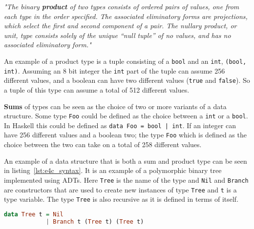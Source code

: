 \documentclass[10pt]{report}
\def\code#1{\texttt{#1}} %
\begin{document}
\par{\textit{"The binary \textbf{product} of two types consists of ordered pairs of values, one from each type in the order specified. The associated eliminatory forms are projections, which select the first and second component of a pair. The nullary product, or unit, type consists solely of the unique “null tuple” of no values, and has no associated eliminatory form."}}
\par{An example of a product type is a tuple consisting of a \code{bool} and an \code{int}, \code{(bool, int)}. Assuming an 8 bit integer the \code{int} part of the tuple can assume 256 different values, and a boolean can have two different values (\code{true} and \code{false}). So a tuple of this type can assume a total of 512 different values.}
\par{\textbf{Sums} of types can be seen as the choice of two or more variants of a data structure. Some type \code{Foo} could be defined as the choice between a \code{int} or a \code{bool}. In Haskell this could be defined as \code{data Foo = bool | int}. If an integer can have 256 different values and a boolean two; the type \code{Foo} which is defined as the choice between the two can take on a total of 258 different values.}

\par{An example of a data structure that is both a sum and product type can be seen in listing~\ref{lst:e4c_syntax}. It is an example of a polymorphic binary tree implemented using ADTs. Here \code{Tree} is the name of the type and \code{Nil} and \code{Branch} are constructors that are used to create new instances of type \code{Tree} and \code{t} is a type variable. The type \code{Tree} is also recursive as it is defined in terms of itself.}


\begin{lstlisting}[language=Haskell,caption={Binary tree definition in Haskell},label={lst:e4c_syntax}]
data Tree t = Nil
            | Branch t (Tree t) (Tree t)
\end{lstlisting}
\end{document}
